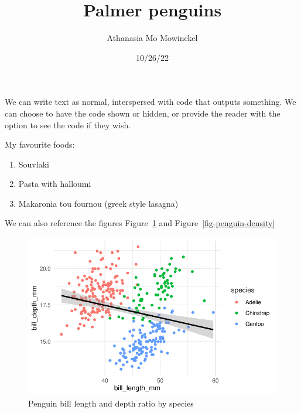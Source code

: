 \documentclass[
  letterpaper,
  DIV=11,
  numbers=noendperiod]{scrartcl}
\title{Palmer penguins}
\author{Athanasia Mo Mowinckel}
\date{10/26/22}
\providecommand{\tightlist}{%
  \setlength{\itemsep}{0pt}\setlength{\parskip}{0pt}}\usepackage{longtable,booktabs,array}
\renewcommand*\contentsname{Table of contents}
\newcommand\contentsname{Table of contents}
\begin{document}
\maketitle
\ifdefined\Shaded\renewenvironment{Shaded}{\begin{tcolorbox}[interior hidden, borderline west={3pt}{0pt}{shadecolor}, breakable, frame hidden, boxrule=0pt, enhanced, sharp corners]}{\end{tcolorbox}}\fi

\renewcommand*\contentsname{Contents}
{
\hypersetup{linkcolor=}
\setcounter{tocdepth}{2}
\tableofcontents
}
\hfill\break
We can write text as normal, interspersed with code that outputs
something. We can choose to have the code shown or hidden, or provide
the reader with the option to see the code if they wish.

My favourite foods:

\begin{enumerate}
\def\labelenumi{\arabic{enumi}.}
\tightlist
\item
  Souvlaki
\item
  Pasta with halloumi
\item
  Makaronia tou fournou (greek style lasagna)
\end{enumerate}

We can also reference the figures Figure~\ref{fig-penguin-smooth} and
Figure~\ref{fig-penguin-density}

\begin{figure}

{\centering \includegraphics{03_pdf_example_files/figure-pdf/fig-penguin-smooth-1.pdf}

}

\caption{\label{fig-penguin-smooth}Penguin bill length and depth ratio
by species}

\end{figure}
\end{document}
